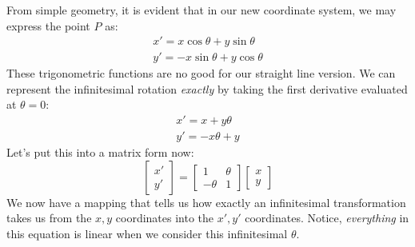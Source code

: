 From simple geometry, it is evident that in our new coordinate system, we may express the point $P$ as:
\begin{gather}
    x'=x\cos\theta+y\sin\theta\\
    y'=-x\sin\theta+y\cos\theta
\end{gather}
These trigonometric functions are no good for our straight line version. We can represent the infinitesimal rotation \textit{exactly} by taking the first derivative evaluated at $\theta=0$:
\begin{gather}
    x'=x+y\theta\\
    y'=-x\theta+y
\end{gather}
Let's put this into a matrix form now:
$$\begin{bmatrix}
    x'\\y'
\end{bmatrix}=\begin{bmatrix}
    1&\theta\\-\theta&1
\end{bmatrix}\begin{bmatrix}
    x\\y
\end{bmatrix}$$
We now have a mapping that tells us how exactly an infinitesimal transformation takes us from the $x,y$ coordinates into the $x',y'$ coordinates. Notice, \textit{everything} in this equation is linear when we consider this infinitesimal $\theta$.

